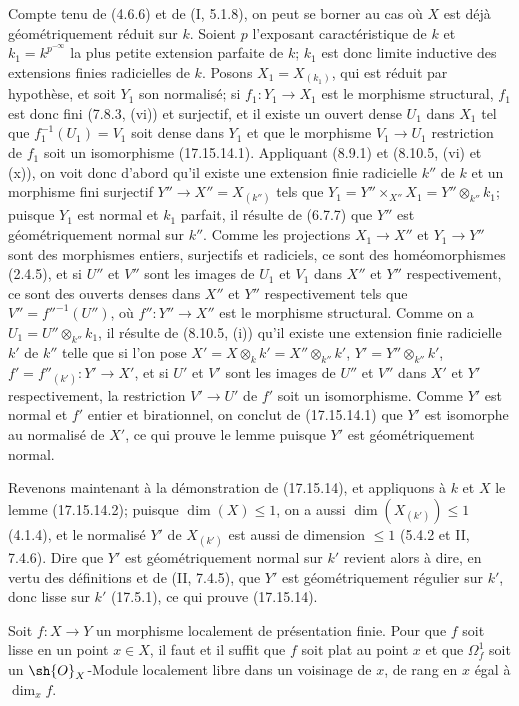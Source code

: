 Compte tenu de (4.6.6) et de (I, 5.1.8), on peut se borner au cas où $X$ est déjà géométriquement réduit sur $k$. Soient $p$ l'exposant caractéristique de $k$ et $k_1=k^{p^{-\infty}}$ la plus petite extension parfaite de $k$; $k_1$ est donc limite inductive des extensions finies radicielles de $k$. Posons $X_1=X_{(k_1)}$, qui est réduit par hypothèse, et soit $Y_1$ son normalisé; si $f_1:Y_1\to X_1$ est le morphisme structural, $f_1$ est donc fini (7.8.3, (vi)) et surjectif, et il existe un ouvert dense $U_1$ dans $X_1$ tel que $f_1^{-1}(U_1)=V_1$ soit dense dans $Y_1$ et que le morphisme $V_1\to U_1$ restriction de $f_1$ soit un isomorphisme (17.15.14.1). Appliquant (8.9.1) et (8.10.5, (vi) et (x)), on voit donc d'abord qu'il existe une extension finie radicielle $k''$ de $k$ et un morphisme fini surjectif $Y''\to X''=X_{(k'')}$ tels que $Y_1=Y''\times_{X''}X_1=Y''\otimes_{k''}k_1$; puisque $Y_1$ est normal et $k_1$ parfait, il résulte de (6.7.7) que $Y''$ est géométriquement normal sur $k''$. Comme les projections $X_1\to X''$ et $Y_1\to Y''$ sont des morphismes entiers, surjectifs et radiciels, ce sont des homéomorphismes (2.4.5), et si $U''$ et $V''$ sont les images de $U_1$ et $V_1$ dans $X''$ et $Y''$ respectivement, ce sont des ouverts denses dans $X''$ et $Y''$ respectivement tels que $V''=f''^{-1}(U'')$, où $f'':Y''\to X''$ est le morphisme structural. Comme on a $U_1=U''\otimes_{k''}k_1$, il résulte de (8.10.5, (i)) qu'il existe une extension finie radicielle $k'$ de $k''$ telle que si l'on pose $X'=X\otimes_k k'=X''\otimes_{k''}k'$, $Y'=Y''\otimes_{k''}k'$, $f'=f''_{(k')}:Y'\to X'$, et si $U'$ et $V'$ sont les images de $U''$ et $V''$ dans $X'$ et $Y'$ respectivement, la restriction $V'\to U'$ de $f'$ soit un isomorphisme. Comme $Y'$ est normal et $f'$ entier et birationnel, on conclut de (17.15.14.1) que $Y'$ est isomorphe au normalisé de $X'$, ce qui prouve le lemme puisque $Y'$ est géométriquement normal.

Revenons maintenant à la démonstration de (17.15.14), et appliquons à $k$ et $X$ le lemme (17.15.14.2); puisque $\dim(X)\leq1$, on a aussi $\dim(X_{(k')})\leq1$ (4.1.4), et le normalisé $Y'$ de $X_{(k')}$ est aussi de dimension $\leq1$ (5.4.2 et II, 7.4.6). Dire que $Y'$ est géométriquement normal sur $k'$ revient alors à dire, en vertu des définitions et de (II, 7.4.5), que $Y'$ est géométriquement régulier sur $k'$, donc lisse sur $k'$ (17.5.1), ce qui prouve (17.15.14).

\begin{proposition}[17.15.15]
\label{IV.17.15.15}
Soit $f:X\to Y$ un morphisme localement de présentation finie. Pour que $f$ soit lisse en un point $x\in X$, il faut et il suffit que $f$ soit plat au point $x$ et que $\Omega^1_f$ soit un $\sh{O}_X$-Module localement libre dans un voisinage de $x$, de rang en $x$ égal à $\dim_x f$.
\end{proposition}

